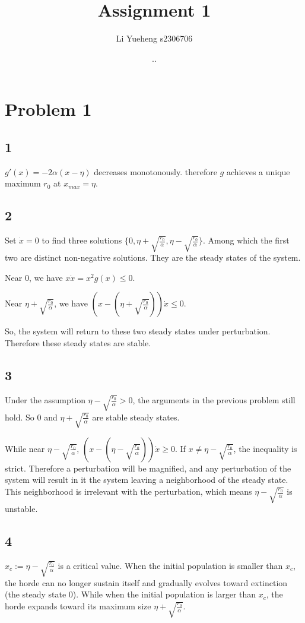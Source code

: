 \documentclass{article}
\renewcommand{\today}{\number\year.\number\month.\number\day}
\begin{document}
\title{Assignment 1}
\author{Li Yueheng s2306706}
\date{\today}
\maketitle


\section*{Problem 1}
\subsection*{1}
$g'(x)=-2\alpha(x-\eta)$ decreases monotonously. therefore $g$ achieves a unique maximum $r_0$ at $x_{max}=\eta$.


\subsection*{2}
Set $\dot{x}=0$ to find three solutions $\{0,\eta+\sqrt{\frac{r_0}{\alpha}},\eta-\sqrt{\frac{r_0}{\alpha}}\}$. Among which the first two are distinct non-negative solutions. They are the steady states of the system.

Near $0$, we have $ x\dot{x} =x^2 g(x) \leq 0$. 

Near $\eta+\sqrt{\frac{r_0}{\alpha}}$, we have $(x-(\eta+\sqrt{\frac{r_0}{\alpha}}))\dot{x}\leq 0$.

So, the system will return to these two steady states under perturbation. Therefore these steady states are stable.


\subsection*{3}
Under the assumption $\eta-\sqrt{\frac{r_0}{\alpha}}>0$, the arguments in the previous problem still hold. So $0$ and $\eta+\sqrt{\frac{r_0}{\alpha}}$ are stable steady states. 

While near $\eta-\sqrt{\frac{r_0}{\alpha}}$, $(x-(\eta-\sqrt{\frac{r_0}{\alpha}}))\dot{x}\geq 0$. If $x\neq \eta-\sqrt{\frac{r_0}{\alpha}}$, the inequality is strict. Therefore a perturbation will be magnified, and any perturbation of the system will result in it the system leaving a neighborhood of the steady state. This neighborhood is irrelevant with the perturbation, which means $\eta-\sqrt{\frac{r_0}{\alpha}}$ is unstable.


\subsection*{4}
$x_c:=\eta-\sqrt{\frac{r_0}{\alpha}}$ is a critical value. When the initial population is smaller than $x_c$, the horde can no longer sustain itself and gradually evolves toward extinction (the steady state $0$). While when the initial population is larger than $x_c$, the horde expands toward its maximum size $\eta+\sqrt{\frac{r_0}{\alpha}}$.
\end{document}
